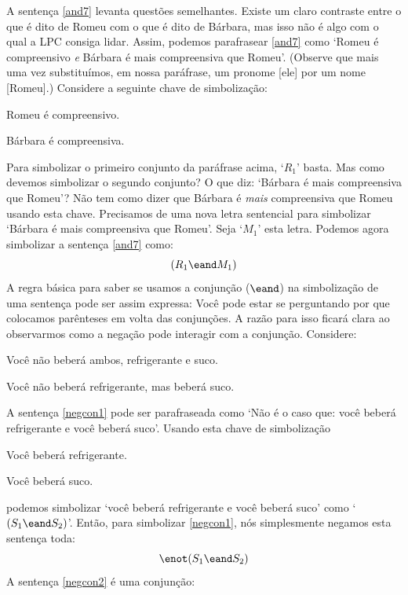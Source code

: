 A sentença \ref{and7} levanta questões semelhantes.
Existe um claro contraste entre o que é dito de Romeu com o que é dito de Bárbara, mas isso não é algo com o qual a LPC consiga lidar.
Assim, podemos parafrasear \ref{and7} como `Romeu é compreensivo \emph{e} Bárbara é mais compreensiva que Romeu'.
(Observe que mais uma vez substituímos, em nossa paráfrase, um pronome [ele] por um nome [Romeu].)
Considere a seguinte chave de simbolização:
	\begin{ekey}
		\item[R_1] Romeu é compreensivo.
		\item[B_2] Bárbara é compreensiva.
	\end{ekey}
Para simbolizar o primeiro conjunto da paráfrase acima, `$R_1$' basta.
Mas como devemos simbolizar o segundo conjunto? O que diz: `Bárbara é mais compreensiva que Romeu'?
Não tem como dizer que Bárbara é \emph{mais} compreensiva que Romeu usando esta chave.
Precisamos de uma nova letra sentencial para simbolizar `Bárbara é mais compreensiva que Romeu'. Seja `$M_1$' esta letra.
Podemos agora simbolizar a sentença \ref{and7} como:
$$(R_1 \eand M_1)$$
A regra básica para saber se usamos a conjunção ($\eand$) na simbolização de uma sentença pode ser assim expressa:
Você pode estar se perguntando por que colocamos parênteses em volta das conjunções.
A razão para isso ficará clara ao observarmos como a negação pode interagir com a conjunção.
Considere:
	\begin{earg}
		\item[\ex{negcon1}] Você não beberá ambos, refrigerante e suco.
		\item[\ex{negcon2}] Você não beberá refrigerante, mas beberá suco.
	\end{earg}
A sentença \ref{negcon1} pode ser parafraseada como `Não é o caso que: você beberá refrigerante e você beberá suco'.
Usando esta chave de simbolização
	\begin{ekey}
		\item[S_1] Você beberá refrigerante.
		\item[S_2] Você beberá suco.
	\end{ekey}
podemos simbolizar `você beberá refrigerante e você beberá suco' como `$(S_1 \eand S_2)$'.
Então, para simbolizar \ref{negcon1}, nós simplesmente negamos esta sentença toda:
$$\enot(S_1 \eand S_2)$$
A sentença \ref{negcon2} é uma conjunção:
